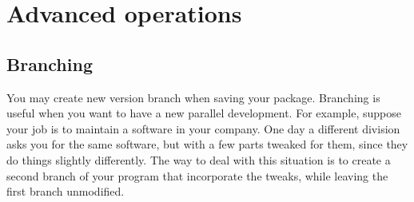 \documentclass[a4paper,10pt,twoside]{book}
\begin{document}




\section{Advanced operations}

\subsection{Branching}

You may create new version branch when saving your package. Branching is useful when you want to have a new parallel development. 
For example, suppose your job is to maintain a software in your company. One day a different division asks you for the same software, but with a few parts tweaked for them, since they do things slightly differently. The way to deal with this situation is to create a second branch of your program that incorporate the tweaks, while leaving the first branch unmodified. 
\end{document}

